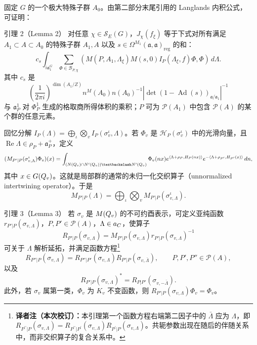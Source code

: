 固定 $G$ 的一个极大特殊子群 $A_0$。由第二部分末尾引用的 Langlands 内积公式，可证明：
\begin{originaltheorem}{引理 2（Lemma 2）}
对任意 $\chi\in\mathcal S_E(G)$，$J_\chi(f_\xi)$ 等于下式对所有满足
$A_1\subset A\subset A_0$ 的特殊子群 $A_1,A$ 以及
$s\in\Omega^{M_1}(\mathfrak a,\mathfrak a)_{\mathrm{reg}}$ 的和：
\[
 c_s\int_{i\mathfrak a_1^G}\sum_{\Phi\in\mathcal B_{P,\chi}}
 (M(P,A_1,\Lambda_\xi)M(s,0)I_P(\Lambda_\xi,f)\Phi,\Phi)\,d\Lambda.
\]
其中 $c_s$ 是
\[
 \left(\frac1{2\pi i}\right)^{\dim(A_1/Z)}
 n^{M}(A_0)n(A_0)^{-1}
 |\det(1-\operatorname{Ad}(s))_{\mathfrak a/\mathfrak a_1}|^{-1}
\]
与 $\mathfrak a_P^1$ 对 $\Phi_P^1$ 生成的格取商所得体积的乘积；$P$ 可为
$\mathcal P(A_1)$ 中包含 $\mathcal P(A)$ 的某个群的任意元素。
\end{originaltheorem}

回忆分解 $I_P(\Lambda)=\bigoplus_\iota\bigotimes_vI_P(\sigma_v^\iota,\Lambda)$。若
$\Phi_v$ 是 $\mathcal H_P(\sigma_v^\iota)$ 中的光滑向量，且
$\operatorname{Re}\Lambda\in\rho_P+\mathfrak a_P^+$，定义
\[
\begin{split}
 (M_{P'|P}(\sigma_{v,\Lambda}^\iota)\Phi_v)(x)
 =\int_{(N(\Q_v)\cap N'(\Q_v))\backslash N'(\Q_v)}
 \Phi_v(nx)e^{\langle\Lambda+\rho_P,H_P(nx)\rangle}
 e^{-\langle\Lambda+\rho_{P'},H_{P'}(x)\rangle}\,dn,
\end{split}
\]
其中 $x\in G(Q_v)$。这就是局部群的通常的未归一化交织算子（unnormalized intertwining operator）。于是
\[
 M_{P'|P}(\Lambda)=\bigoplus_\iota\bigotimes_vM_{P'|P}(\sigma_{v,\Lambda}^\iota).
\]

\begin{originaltheorem}{引理 3（Lemma 3）}
若 $\sigma_v$ 是 $M(Q_v)$ 的不可约酉表示，可定义亚纯函数
$r_{P'|P}(\sigma_{v,\Lambda})$，$P,P'\in\mathcal P(A)$，$\Lambda\in a_C$，使算子
\[
 R_{P'|P}(\sigma_{v,\Lambda})
 =M_{P'|P}(\sigma_{v,\Lambda})r_{P'|P}(\sigma_{v,\Lambda})^{-1}
\]
可关于 $\Lambda$ 解析延拓，并满足函数方程\footnote{\textbf{译者注（本次校订）：}本引理第一个函数方程右端第二因子中的 $\bar\Lambda$ 应为 $\Lambda$，即 $R_{P^{\prime\prime}|P}(\sigma_{v,\Lambda})=R_{P^{\prime\prime}|P^\prime}(\sigma_{v,\Lambda})R_{P^\prime|P}(\sigma_{v,\Lambda})$。共轭参数出现在随后的伴随关系中，而非交织算子的复合关系中。}
\[
 R_{P''|P}(\sigma_{v,\Lambda})
 =R_{P''|P'}(\sigma_{v,\Lambda})R_{P'|P}(\sigma_{v,\bar\Lambda}),
 \qquad P,P',P''\in\mathcal P(A),
\]
以及
\[
 R_{P'|P}(\sigma_{v,\Lambda})^*=R_{P|P'}(\sigma_{v,-\bar\Lambda}).
\]
此外，若 $\sigma_v$ 属第一类，$\Phi_v$ 为 $K_v$ 不变函数，则
$R_{P'|P}(\sigma_{v,\Lambda})\Phi_v=\Phi_v$。
\end{originaltheorem}


